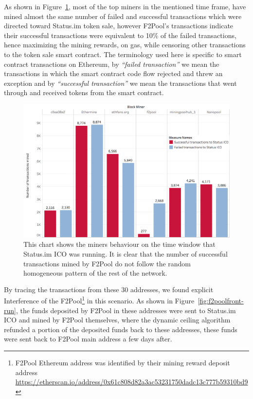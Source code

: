 As shown in Figure~\ref{fig:Transactions_miners_while_status_ico_cut}, most of the top miners in the mentioned time frame, have mined almost the same number of failed and successful transactions which were directed toward Status.im token sale, however F2Pool's transactions indicate their successful transactions were equivalent to 10\% of the failed transactions, hence maximizing the mining rewards, on gas, while censoring other transactions to the token sale smart contract. The terminology used here is specific to smart contract transactions on Ethereum, by \textit{``failed transaction''} we mean the transactions in which the smart contract code flow rejected and threw an exception and by \textit{``successful transaction''} we mean the transactions that went through and received tokens from the smart contract. 


\begin{figure}[h]
\centering
\includegraphics[width=0.7\linewidth]{figures/Transactions_miners_while_status_ico_cut_only_icotx.png}
\caption{This chart shows the miners behaviour on the time window that Status.im ICO was running. It is clear that the number of successful transactions mined by F2Pool do not follow the random homogeneous pattern of the rest of the network. \label{fig:Transactions_miners_while_status_ico_cut}} 
\end{figure}


By tracing the transactions from these 30 addresses, we found explicit Interference of the F2Pool\footnote{F2Pool Ethereum address was identified by their mining reward deposit address \url{https://etherscan.io/address/0x61c808d82a3ac53231750dadc13c777b59310bd9}} in this scenario. As shown in Figure~\ref{fig:f2poolfront-run}, the funds deposited by F2Pool in these addresses were sent to Status.im ICO and mined by F2Pool themselves, where the dynamic ceiling algorithm refunded a portion of the deposited funds back to these addresses, these funds were sent back to F2Pool main address a few days after. 

